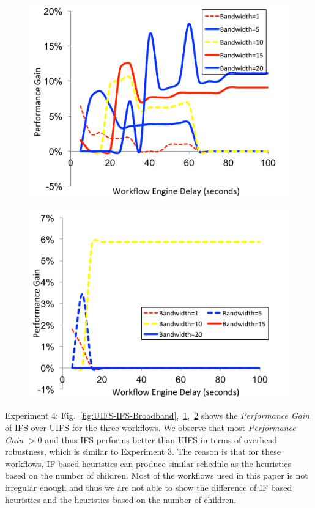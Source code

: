 \documentclass[final]{IEEEtran}
\begin{document}
\begin{figure}[!htb]
\centering
 \includegraphics[width=0.9\linewidth]{figure/UIFS-IFS-CyberShake.pdf}
  \label{fig:UIFS-IFS-CyberShake}
  \vspace{-10pt}
\end{figure}

\begin{figure}[!htb]
\centering
 \includegraphics[width=0.9\linewidth]{figure/UIFS-IFS-Montage.pdf}
  \label{fig:UIFS-IFS-Montage}
  \vspace{-10pt}
\end{figure}
Experiment 4: Fig.~\ref{fig:UIFS-IFS-Broadband},~\ref{fig:UIFS-IFS-CyberShake},~\ref{fig:UIFS-IFS-Montage} shows the \emph{Performance Gain} of IFS over UIFS for the three workflows. We observe that most  \emph{Performance Gain} $>0$ and thus IFS performs better than UIFS in terms of overhead robustness, which is similar to Experiment 3. The reason is that for these workflows, IF based heuristics can produce similar schedule as the heuristics based on the number of children. Most of the workflows used in this paper is not irregular enough and thus we are not able to show the difference of IF based heuristics and the heuristics based on the number of children. 
\end{document}
